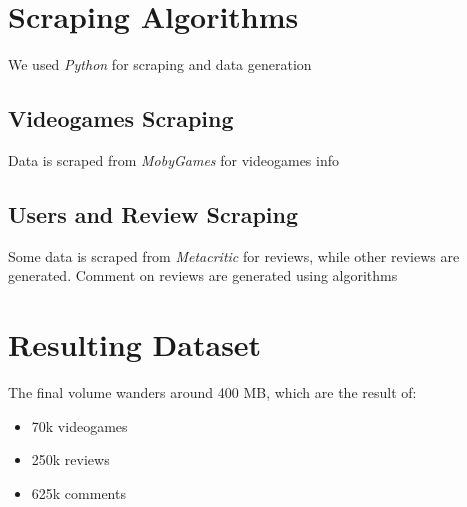 \section{Scraping Algorithms}
We used \emph{Python} for scraping and data generation
\subsection{Videogames Scraping}
Data is scraped from \emph{MobyGames} for videogames info
\subsection{Users and Review Scraping}
Some data is scraped from \emph{Metacritic} for reviews, while other reviews are generated.
Comment on reviews are generated using algorithms 
\section{Resulting Dataset}
The final volume wanders around 400 MB, which are the result of:
\begin{itemize}
	\item 70k videogames
	\item 250k reviews 
	\item 625k comments
\end{itemize}

